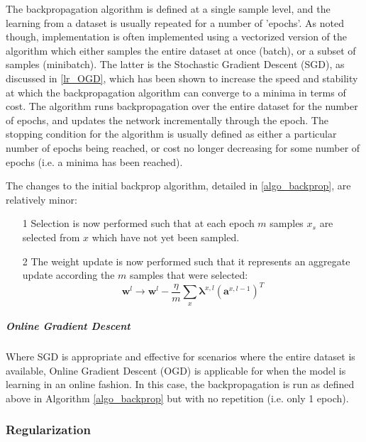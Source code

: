 \documentclass[a4paper,11pt,oneside]{article}
\theoremstyle{plain}
\theoremstyle{definition}
\begin{document}
The backpropagation algorithm is defined at a single sample level, and the learning from a dataset is usually repeated for a number of 'epochs'. As noted though, implementation is often implemented using a vectorized version of the algorithm which either samples the entire dataset at once (batch), or a subset of samples (minibatch). The latter is the Stochastic Gradient Descent (SGD), as discussed in \ref{lr_OGD}, which has been shown to increase the speed and stability at which the backpropagation algorithm can converge to a minima in terms of cost. The algorithm runs backpropagation over the entire dataset for the number of epochs, and updates the network incrementally through the epoch. The stopping condition for the algorithm is usually defined as either a particular number of epochs being reached, or cost no longer decreasing for some number of epochs (i.e. a minima has been reached).\newline

The changes to the initial backprop algorithm, detailed in \ref{algo_backprop}, are relatively minor:
\begin{itemize}
	\item [1] Selection is now performed such that at each epoch $m$ samples $x_s$ are selected from $x$ which have not yet been sampled.
	\item [2] The weight update is now performed such that it represents an aggregate update according the $m$ samples that were selected:
			\begin{equation}\label{eq_backprop_weightupdate_sgd}
			\mathbf{w}^l \rightarrow \mathbf{w}^l - \frac{\eta}{m} \sum_{x} \mathbf{\lambda}^{x, l} (\mathbf{a}^{x, l - 1})^T
			\end{equation}
\end{itemize}

\texttt{}\newline 

\subparagraph{Online Gradient Descent}
Where SGD is appropriate and effective for scenarios where the entire dataset is available, Online Gradient Descent (OGD) is applicable for when the model is learning in an online fashion. In this case, the backpropagation is run as defined above in Algorithm \ref{algo_backprop} but with no repetition (i.e. only 1 epoch).

\subsubsection{Regularization}\label{imp_regularization}
\end{document}
